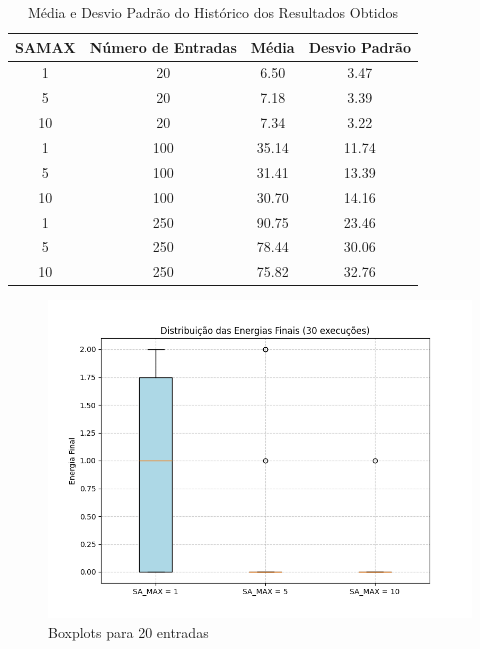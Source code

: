 \documentclass[12pt]{article}
\begin{document}
\begin{table}[H]
  \centering
  \caption{Média e Desvio Padrão do Histórico dos Resultados Obtidos}
  \begin{tabular}{|c|c|c|c|}
    \hline
    \textbf{SAMAX} & \textbf{Número de Entradas} & \textbf{Média} & \textbf{Desvio Padrão} \\ \hline
    1   & 20 & 6.50 & 3.47 \\ \hline
    5   & 20 & 7.18 & 3.39 \\ \hline
    10  & 20 & 7.34 & 3.22 \\ \hline
    1   & 100 & 35.14 & 11.74 \\ \hline
    5   & 100 & 31.41 & 13.39 \\ \hline
    10  & 100 & 30.70 & 14.16 \\ \hline
    1   & 250 & 90.75 & 23.46 \\ \hline
    5   & 250 & 78.44 & 30.06 \\ \hline
    10  & 250 & 75.82 & 32.76 \\ \hline
  
  \end{tabular}
  \label{tab:resultados}
  \end{table}


\begin{figure}[H]
  \centering
  \includegraphics[width=.9\textwidth]{../../boxplot_20.png}
  \caption{Boxplots para 20 entradas}
  \label{fig:metodologia}
  \end{figure}
\end{document}
